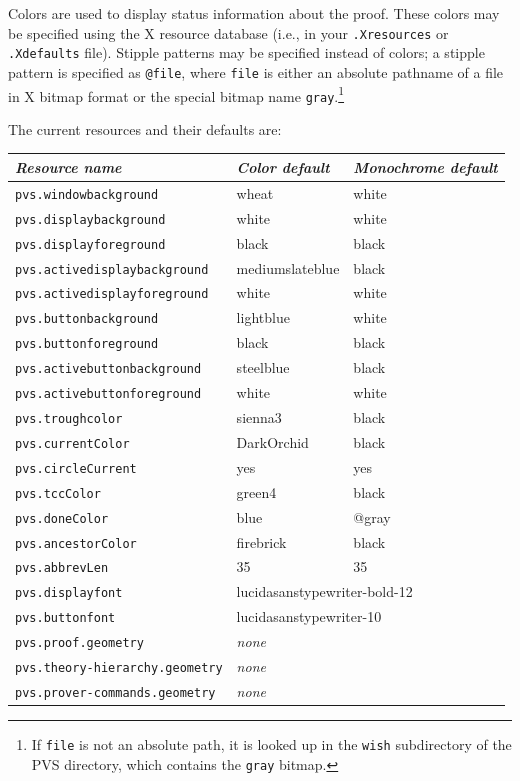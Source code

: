 Colors are used to display status information about the proof.  These
colors may be specified using the X resource database (i.e., in your
\texttt{.Xresources} or \texttt{.Xdefaults} file).  Stipple patterns may
be specified instead of colors; a stipple pattern is specified as
\texttt{@file}, where \texttt{file} is either an absolute pathname of a
file in X bitmap format or the special bitmap name
\texttt{gray}.\footnote{If \texttt{file} is not an absolute path, it is
looked up in the \texttt{wish} subdirectory of the PVS directory, which
contains the \texttt{gray} bitmap.}

The current resources and their defaults are:

\begin{center}
\begin{tabular}{|lll|}\hline
  {\it Resource name} & {\it Color default} & {\it Monochrome default}%
     \\ \hline
  \texttt{pvs.windowbackground} & wheat & white \\
  \texttt{pvs.displaybackground} & white & white \\
  \texttt{pvs.displayforeground} & black & black \\
  \texttt{pvs.activedisplaybackground} & mediumslateblue & black \\
  \texttt{pvs.activedisplayforeground} & white & white \\
  \texttt{pvs.buttonbackground} & lightblue & white \\
  \texttt{pvs.buttonforeground} & black & black \\
  \texttt{pvs.activebuttonbackground} & steelblue & black \\
  \texttt{pvs.activebuttonforeground} & white & white \\
  \texttt{pvs.troughcolor} & sienna3 & black \\
  \texttt{pvs.currentColor} & DarkOrchid & black \\
  \texttt{pvs.circleCurrent} & yes & yes \\
  \texttt{pvs.tccColor} & green4 & black \\
  \texttt{pvs.doneColor} & blue & @gray \\
  \texttt{pvs.ancestorColor} & firebrick & black \\
  \texttt{pvs.abbrevLen} & 35 & 35 \\
  \texttt{pvs.displayfont} & \multicolumn{2}{l|}{lucidasanstypewriter-bold-12} \\
  \texttt{pvs.buttonfont} & \multicolumn{2}{l|}{lucidasanstypewriter-10} \\
  \texttt{pvs.proof.geometry} & \multicolumn{2}{l|}{\hspace*{.5in}\emph{none}} \\
  \texttt{pvs.theory-hierarchy.geometry} & \multicolumn{2}{l|}{\hspace*{.5in}\emph{none}} \\
  \texttt{pvs.prover-commands.geometry} & \multicolumn{2}{l|}{\hspace*{.5in}\emph{none}} \\
  \hline
\end{tabular}
\end{center}

